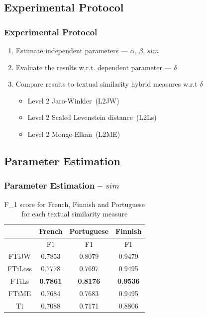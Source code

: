 \documentclass{beamer}
\begin{document}
\subsection{Experimental Protocol}
\begin{frame}
	\frametitle{Experimental Protocol}
	\begin{enumerate}
	\item Estimate independent parameters ---  \(\alpha\), \(\beta\), \(sim\)
	\vfill
	\item Evaluate the results w.r.t. dependent parameter --- \(\delta\)
	\vfill
	\item Compare results to textual similarity hybrid measures w.r.t \(\delta\)
	\begin{itemize}
	\item Level 2 Jaro-Winkler~(L2JW)
	\item Level 2 Scaled Levenstein distance~(L2Ls)
	\item Level 2 Monge-Elkan~(L2ME)
	\end{itemize}
	\end{enumerate}
\end{frame}

\subsection{Parameter Estimation}

\begin{frame}
	\frametitle{Parameter Estimation -- \(sim\)}
	\begin{table}
	{\centering \footnotesize
	\begin{tabular}{|c|c|c|c|}
	\hline &French&Portuguese&Finnish\\
	\hline &F1&F1&F1\\
	\hline FTiJW&0.7853&0.8079&0.9479\\
	\hline FTiLcss&0.7778&0.7697&0.9495\\
	\hline FTiLs&\textbf{0.7861}&\textbf{0.8176}&\textbf{0.9536}\\
	\hline FTiME&0.7684&0.7683&0.9495\\
	\hline Ti&0.7088&0.7171&0.8806\\
	\hline 
	\end{tabular} 
	\caption{\scriptsize F\_1 score for French, Finnish and Portuguese for each textual similarity measure}
	\label{tab:expe1}
	}
	\end{table}
\end{frame}
\end{document}
